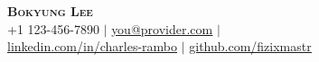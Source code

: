 \documentclass[letterpaper,11pt]{article} %
\begin{document}
\begin{comment}
In Europe it is common to include a picture of ones self in the CV. Select which heading appropriate for the document you are creating.
\end{comment}


\begin{center}
    \textbf{\Huge \scshape Bokyung Lee} \\ \vspace{1pt} %
    \small +1 123-456-7890 $|$ 
    \href{mailto:you@provider.com}{\underline{you@provider.com}} $|$\\
    \href{https://linkedin.com/in/your-name-here}{\underline{linkedin.com/in/charles-rambo}} $|$
    \href{https://github.com/fizixmastr}{\underline{github.com/fizixmastr}}
\end{center}
\end{document}
